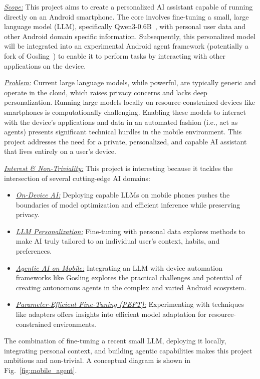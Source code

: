 \documentclass[conference]{IEEEtran}
\begin{document}
\textit{\uline{Scope:}} This project aims to create a personalized AI assistant capable of running directly on an Android smartphone. The core involves fine-tuning a small, large language model (LLM), specifically Qwen3-0.6B~\cite{qwen}, with personal user data and other Android domain specific information. Subsequently, this personalized model will be integrated into an experimental Android agent framework (potentially a fork of Gosling~\cite{gosling}) to enable it to perform tasks by interacting with other applications on the device.

\textit{\uline{Problem:}} Current large language models, while powerful, are typically generic and operate in the cloud, which raises privacy concerns and lacks deep personalization. Running large models locally on resource-constrained devices like smartphones is computationally challenging. Enabling these models to interact with the device's applications and data in an automated fashion (i.e., act as agents) presents significant technical hurdles in the mobile environment. This project addresses the need for a private, personalized, and capable AI assistant that lives entirely on a user's device.

\textit{\uline{Interest \& Non-Triviality:}} This project is interesting because it tackles the intersection of several cutting-edge AI domains:
\begin{itemize}
    \item \textit{\uline{On-Device AI:}} Deploying capable LLMs on mobile phones pushes the boundaries of model optimization and efficient inference while preserving privacy.
    \item \textit{\uline{LLM Personalization:}} Fine-tuning with personal data explores methods to make AI truly tailored to an individual user's context, habits, and preferences.
    \item \textit{\uline{Agentic AI on Mobile:}} Integrating an LLM with device automation frameworks like Gosling explores the practical challenges and potential of creating autonomous agents in the complex and varied Android ecosystem.
    \item \textit{\uline{Parameter-Efficient Fine-Tuning (PEFT):}} Experimenting with techniques like adapters offers insights into efficient model adaptation for resource-constrained environments.
\end{itemize}

The combination of fine-tuning a recent small LLM, deploying it locally, integrating personal context, and building agentic capabilities makes this project ambitious and non-trivial. A conceptual diagram is shown in Fig.~\ref{fig:mobile_agent}.
\end{document}
